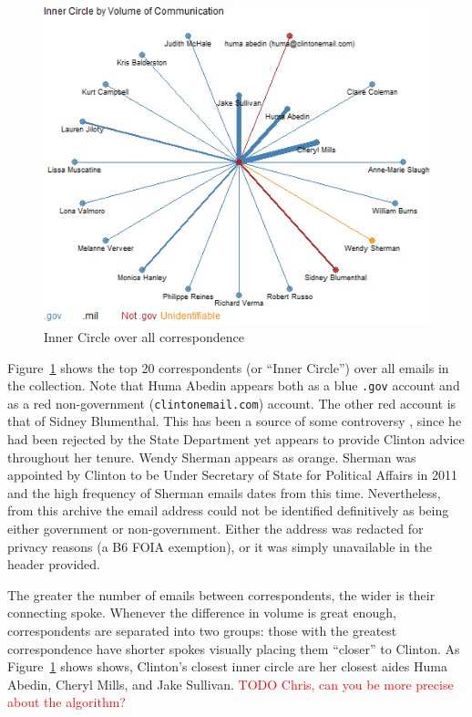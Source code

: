 \documentclass[journal]{vgtc}                %
\newcommand*{\TODO}[1]{\textcolor{red}{TODO #1}}
\begin{document}
\begin{figure}[h]
\begin{center}
\includegraphics[width=0.95\linewidth]{SpiralNetworkFullTime}
\caption{Inner Circle over all correspondence}
\label{fig:InnerCircleAll}
\end{center}
\end{figure}
Figure~\ref{fig:InnerCircleAll} shows the top 20 correspondents (or ``Inner Circle'')  over all emails in the collection.
Note that Huma Abedin appears both as a blue  \texttt{.gov} account and as a red non-government (\texttt{clintonemail.com}) account.   The other red account is that of Sidney Blumenthal.  This has been a source of some controversy  \cite{BlumenthalControversy, NYTBlumenthalBenghazi}, since he had been rejected by the State Department yet appears to provide Clinton advice throughout her tenure.  Wendy Sherman appears as orange. Sherman was appointed by Clinton to be Under Secretary of State for Political Affairs in 2011 and the high frequency of Sherman emails dates from this time.  Nevertheless, from this archive the email address could not be identified definitively as being either government or non-government.  Either the address was redacted for privacy reasons (a B6 FOIA exemption), or it was simply unavailable in the header provided.

The greater the number of emails between correspondents, the wider is their connecting spoke.  Whenever the difference in volume is great enough,  correspondents are separated into two groups: those with the greatest correspondence have shorter spokes visually placing them ``closer'' to Clinton.   As Figure~\ref{fig:InnerCircleAll} shows shows, Clinton's closest inner circle are her closest aides Huma Abedin, Cheryl Mills, and Jake Sullivan. \TODO{Chris, can you be more precise about the algorithm?}
\end{document}
